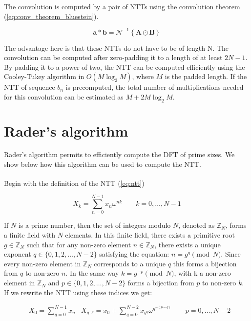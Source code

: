\documentclass[english,master=eelt,masteroption=ec]{kulemt}
\begin{document}
The convolution is computed by a pair of NTTs using the convolution theorem (\ref{eq:conv_theorem_bluestein}).

\begin{equation}
\label{eq:conv_theorem_bluestein}
\mathbf{a} \ast \mathbf{b} = \mathcal{N}^{-1}\left\{\mathbf{A}\odot \mathbf{B}\right\}
\end{equation}

The advantage here is that these NTTs do not have to be of length N. The convolution can be computed after zero-padding it to a length of at least $2N-1$.
By padding it to a power of two, the NTT can be computed efficiently using the Cooley-Tukey algorithm in $O\left(M\log_2 M\right)$, where $M$ is the padded length.
If the NTT of sequence $b_n$ is precomputed, the total number of multiplications needed for this convolution can be estimated as $M + 2 M\log_2 M$.

\section{Rader's algorithm}

Rader's algorithm permits to efficiently compute the DFT of prime sizes. \cite{1448407}
We show below how this algorithm can be used to compute the NTT.
\\\\
Begin with the definition of the NTT (\ref{eq:ntt})

\[X_k = \sum_{n=0}^{N-1} x_n \omega^{nk} \qquad k=0,\ldots,N-1\]

If $N$ is a prime number, then the set of integers modulo $N$, denoted as $\mathbb{Z}_N$, forms a finite field with $N$ elements. In this finite field, there exists a primitive root $g \in \mathbb{Z}_N$ such that for any non-zero element $n \in \mathbb{Z}_N$, there exists a unique exponent $q \in \{0, 1, 2, \ldots, N-2\}$ satisfying the equation: $n = g^q \pmod{N}$. Since every non-zero element in $\mathbb{Z}_N$ corresponds to a unique $q$ this forms a bijection from $q$ to non-zero $n$. In the same way $k = g^{-p} \pmod{N}$, with k a non-zero element in $\mathbb{Z}_N$ and $p \in \{0, 1, 2, \ldots, N-2\}$ forms a bijection from $p$ to non-zero $k$. If we rewrite the NTT using these indices we get:

\begin{equation}
\begin{split}
& X_0 = \sum_{q=0}^{N-1} x_n
& X_{g^{-p}} = x_0 + \sum_{q=0}^{N-2} x_{g^q} \omega^{g^{-\left(p-q\right)}} \qquad p=0,\ldots,N-2
\end{split}
\end{equation}
\end{document}
